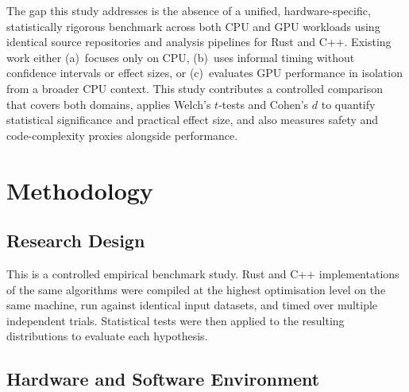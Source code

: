 \documentclass{article}
\begin{document}
The gap this study addresses is the absence of a unified, hardware-specific,
statistically rigorous benchmark across both CPU and GPU workloads using
identical source repositories and analysis pipelines for Rust and C++.
Existing work either (a)~focuses only on CPU, (b)~uses informal timing
without confidence intervals or effect sizes, or (c)~evaluates GPU
performance in isolation from a broader CPU context.
This study contributes a controlled comparison that covers both domains,
applies Welch's $t$-tests and Cohen's $d$ to quantify statistical
significance and practical effect size, and also measures safety and
code-complexity proxies alongside performance.

\section{Methodology}
\label{sec:methodology}

\subsection{Research Design}

This is a controlled empirical benchmark study.
Rust and C++ implementations of the same algorithms were compiled at the
highest optimisation level on the same machine, run against identical
input datasets, and timed over multiple independent trials.
Statistical tests were then applied to the resulting distributions to
evaluate each hypothesis.

\subsection{Hardware and Software Environment}
\end{document}

